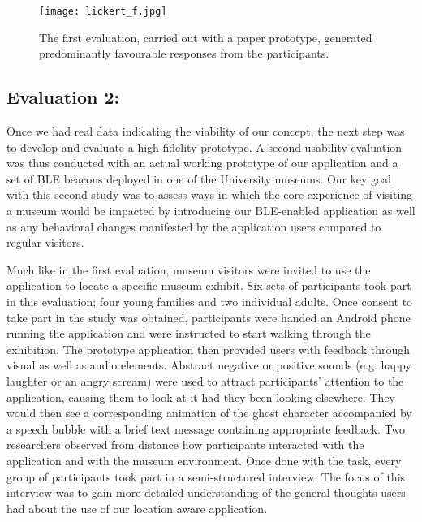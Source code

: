 \documentclass[prodmode,acmtomm]{acmsmall}
\begin{document}
\begin{figure}[h!]
 \vspace{-15pt}
\begin{center}
\begin{center}
\texttt{[image: lickert\_f.jpg]}
\end{center}
\vspace{-18pt}\textcolor{black}{
\caption{The first evaluation, carried out with a paper prototype, generated predominantly favourable responses from the participants.}}
\end{center}
 \vspace{-15pt}
\end{figure}

\subsection{Evaluation 2: }
Once we had real data indicating the viability of our concept, the next step was to develop and evaluate a high fidelity prototype. A second usability evaluation was thus conducted with an actual working prototype of our application and a set of BLE beacons deployed in one of the University museums. Our key goal with this second study was to assess ways in which the core experience of visiting a museum would be impacted by introducing our BLE-enabled application as well as any behavioral changes manifested by the application users compared to regular visitors. 

Much like in the first evaluation, museum visitors were invited to use the application to locate a specific museum exhibit. Six sets of participants took part in this evaluation; four young families and two individual adults. Once consent to take part in the study was obtained, participants were handed an Android phone running the application and were instructed to start walking through the exhibition. The prototype application then provided users with feedback through visual as well as audio elements. Abstract negative or positive sounds (e.g. happy laughter or an angry scream) were used to attract participants' attention to the application, causing them to look at it had they been looking elsewhere. They would then see a corresponding animation of the ghost character accompanied by a speech bubble with a brief text message containing appropriate feedback. Two researchers observed from distance how participants interacted with the application and with the museum environment. Once done with the task, every group of participants took part in a semi-structured interview. The focus of this interview was to gain more detailed understanding of the general thoughts users had about the use of our location aware application. 
\end{document}
